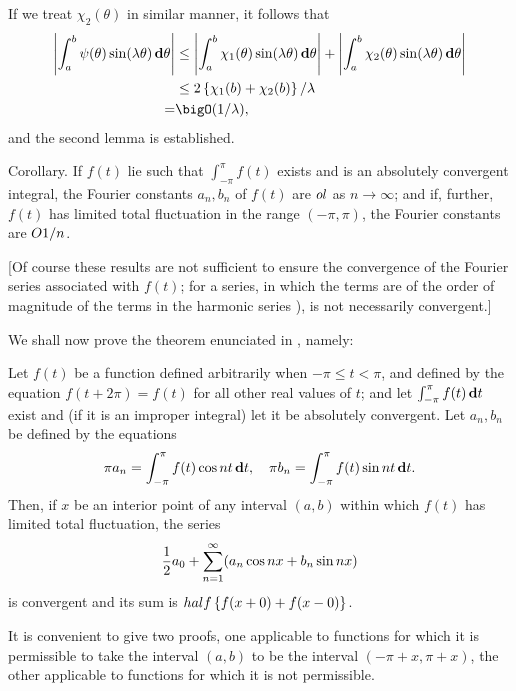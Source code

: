 If we treat $\chi_{2}(\theta)$ in similar manner, it follows that
\begin{align*}
  \absval{
    \int_{a}^{b} \psi (\theta) \sin(\lambda \theta) \dmeasure \theta
  }
  &
  \leq
  \absval{
    \int_{a}^{b} \chi_{1}(\theta) \sin(\lambda\theta) \dmeasure \theta
  }
  +
  \absval{
    \int_{a}^{b} \chi_{2}(\theta) \sin(\lambda\theta) \dmeasure \theta
  }
  \\
  &
  \leq
  2 \thebrace{ \chi_{1}(b) + \chi_{2}(b) } / \lambda
  \\
  = &
  \bigO(1 / \lambda),
\end{align*}
and the second lemma is established.

Corollary. If $f(t)$ lie such that $\int_{-\pi}^{\pi} f(t)$ %
exists and is an absolutely convergent integral,
the Fourier constants $a_{n}, b_{n}$ of $f(t)$ are $o{l}$ as
$n \rightarrow \infty$;
and if, further, $f(t)$ has limited total fluctuation in the range
$(-\pi, \pi)$, the Fourier constants are $O{1/n}$.

[Of course these results are not sufficient to ensure the convergence
of the Fourier series associated with $f(t)$; for a series, in which the
terms are of the order of magnitude of the terms in the harmonic
series ), is not necessarily convergent.]

%
%


We shall now prove the theorem enunciated in , namely:

Let $f(t)$ be a function defined arbitrarily when $-\pi \leq t < \pi$, and defined by the
equation $f(t + 2\pi) = f(t)$ for all other real values of $t$; and let
$\int_{-\pi}^{\pi} f(t) \, \mathbf{d} t$
exist and (if it is an improper integral) let it be absolutely
convergent. Let $a_{n}, b_{n}$ be defined by the equations
$$
\pi a_{n} = \int_{-\pi}^{\pi} f(t) \cos nt \, \mathbf{d} t,
\quad
\pi b_{n} = \int_{-\pi}^{\pi} f(t) \sin nt \, \mathbf{d} t.
$$
Then, if $x$ be an interior point of any interval $(a, b)$ within which
$f(t)$ has limited total fluctuation, the series
$$
\frac{1}{2} a_{0}
+
\sum_{n=1}^{\infty} (
a_{n} \cos nx + b_{n} \sin nx
)
$$
is convergent and its sum is $half \left\{ f(x+0) + f(x-0) \right\}$.

It is convenient to give two proofs, one applicable to functions for
which it is permissible to take the interval $(a, b)$ to be the interval
$(-\pi+x, \pi + x)$, the other applicable to functions for which it is
not permissible.

